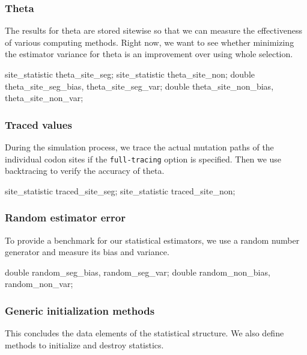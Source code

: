 \documentclass{article}
\begin{document}
      \subsubsection{Theta}

	The results for theta are stored sitewise so that we can measure the
	effectiveness of various computing methods. Right now, we want to see
	whether minimizing the estimator variance for theta is an improvement
	over using whole selection.

\begin{ccode}
  site_statistic	theta_site_seg;
  site_statistic	theta_site_non;
  double		theta_site_seg_bias, theta_site_seg_var;
  double		theta_site_non_bias, theta_site_non_var;
\end{ccode}

      \subsubsection{Traced values}

	During the simulation process, we trace the actual mutation paths of the
	individual codon sites if the \verb|full-tracing| option is specified.
	Then we use backtracing to verify the accuracy of theta.

\begin{ccode}
  site_statistic	traced_site_seg;
  site_statistic	traced_site_non;
\end{ccode}

      \subsubsection{Random estimator error}

	To provide a benchmark for our statistical estimators, we use a random
	number generator and measure its bias and variance.

\begin{ccode}
  double		random_seg_bias, random_seg_var;
  double		random_non_bias, random_non_var;
\end{ccode}

      \subsubsection{Generic initialization methods}

	This concludes the data elements of the statistical structure. We also
	define methods to initialize and destroy statistics.
\end{document}
